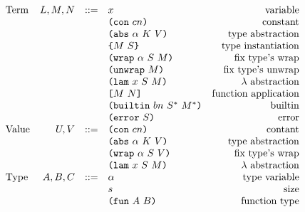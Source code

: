 \documentclass[../main.tex]{subfiles}
\begin{document}
\begin{figure*}[t]
    \centering
    \[\begin{array}{lrclr}
        \textrm{Term}             & L,M,N  & ::= & x                          & \textrm{variable}\\
                                  &        &     & \texttt{(} \texttt{con} ~ cn \texttt{)}                   & \textrm{constant}\\
                                  &        &     & \texttt{(} \texttt{abs} ~ \alpha ~ K ~ V \texttt{)}         & \textrm{type abstraction}\\
                                  &        &     & \texttt{\{}M ~ S\texttt{\}}                & \textrm{type instantiation}\\
                                  &        &     & \texttt{(} \texttt{wrap} ~ \alpha ~ S ~ M \texttt{)}        & \textrm{fix type's wrap}\\
                                  &        &     & \texttt{(} \texttt{unwrap} ~ M \texttt{)}                 & \textrm{fix type's unwrap}\\
                                  &        &     & \texttt{(} \texttt{lam} ~ x ~ S ~ M \texttt{)}              & \textrm{$\lambda$ abstraction}\\
                                  &        &     & \texttt{[} M ~ N \texttt{]}                 & \textrm{function application}\\
                                  &        &     & \texttt{(} \texttt{builtin} ~ bn ~ S^* ~ M^* \texttt{)}     & \textrm{builtin}\\
                                  &        &     & \texttt{(} \texttt{error} ~ S \texttt{)}                  & \textrm{error}\\
        \textrm{Value}            & U, V   & ::= & \texttt{(} \texttt{con} ~ cn \texttt{)}                   & \textrm{contant}\\
                                  &        &     & \texttt{(} \texttt{abs} ~ \alpha ~ K ~ V \texttt{)}         & \textrm{type abstraction}\\
                                  &        &     & \texttt{(} \texttt{wrap} ~ \alpha ~ S ~ V \texttt{)}        & \textrm{fix type's wrap}\\
                                  &        &     & \texttt{(} \texttt{lam} ~ x ~ S ~ M \texttt{)}              & \textrm{$\lambda$ abstraction}\\
        \textrm{Type}             & A,B,C  & ::= & \alpha                     & \textrm{type variable}\\
                                  &        &     & s                          & \textrm{size}\\
                                  &        &     & \texttt{(} \texttt{fun} ~ A ~ B \texttt{)}                & \textrm{function type}\\

\end{array}\]
\end{figure*}
\end{document}
